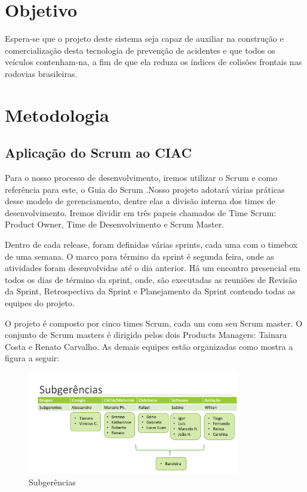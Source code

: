 \section{Objetivo}

Espera-se que o projeto deste sistema seja capaz de auxiliar na construção e comercialização desta tecnologia de prevenção de acidentes e que todos os veículos contenham-na, a fim de que ela reduza os índices de colisões frontais nas rodovias brasileiras.

\section{Metodologia}

\subsection{Aplicação do Scrum ao CIAC}

Para o nosso processo de desenvolvimento, iremos utilizar o Scrum e como referência para este, o Guia do Scrum \cite{guiaScrum}.Nosso projeto adotará várias práticas desse modelo de gerenciamento, dentre elas a divisão interna dos times de desenvolvimento. Iremos dividir em três papeis chamados de Time Scrum: Product Owner, Time de Desenvolvimento e Scrum Master. 

Dentro de cada release, foram definidas várias sprints, cada uma com o timebox de uma semana. O marco para término da sprint é segunda feira, onde as atividades foram desenvolvidas até o dia anterior. Há um encontro presencial em todos os dias de término da sprint, onde, são executadas as reuniões de Revisão da Sprint, Retrospectiva da Sprint e Planejamento da Sprint contendo todas as equipes do projeto.

O projeto é composto por cinco times Scrum, cada um com seu Scrum master. O conjunto de Scrum masters é dirigido pelos dois Products Managers: Tainara Costa e Renato Carvalho. As demais equipes estão organizadas como mostra a figura a seguir: 

\begin{figure}[h]
  \centering
  \includegraphics[width=350px, scale=0.5]{figuras/time}
  \caption{Subgerências}
\label{fig:time}
\end{figure}

